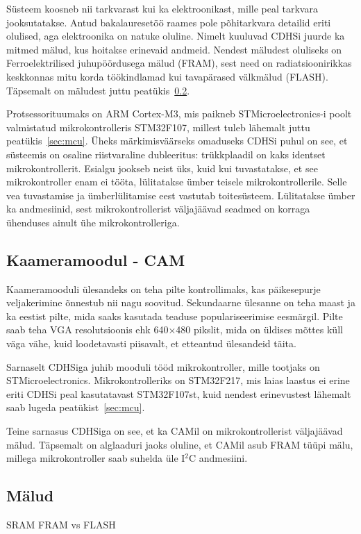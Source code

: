 \documentclass[12pt,a4paper]{article}
\newcommand{\iic}{I\({}^2\)C }
\begin{document}
Süsteem koosneb nii tarkvarast kui ka elektroonikast, mille peal tarkvara
jooksutatakse. Antud bakalauresetöö raames pole põhitarkvara detailid eriti
olulised, aga elektroonika on natuke oluline. Nimelt kuuluvad CDHSi juurde ka
mitmed mälud, kus hoitakse erinevaid andmeid. Nendest mäludest oluliseks on
Ferroelektrilised juhupöördusega mälud (FRAM), sest need on radiatsioonirikkas
keskkonnas mitu korda töökindlamad kui tavapärased välkmälud (FLASH). Täpsemalt
on mäludest juttu peatükis~\ref{sec:m2lud}.

Protsessorituumaks on ARM Cortex-M3, mis paikneb STMicroelectronics-i poolt
valmistatud mikrokontrolleris STM32F107, millest tuleb lähemalt juttu
peatükis~\ref{sec:mcu}. Üheks märkimisväärseks omaduseks CDHSi puhul on see, et
süsteemis on osaline riistvaraline dubleeritus: trükkplaadil on kaks identset
mikrokontrollerit. Esialgu jookseb neist üks, kuid kui tuvastatakse, et see
mikrokontroller enam ei tööta, lülitatakse ümber teisele mikrokontrollerile.
Selle vea tuvastamise ja ümberlülitamise eest vastutab toitesüsteem. Lülitatakse
ümber ka andmesiinid, sest mikrokontrollerist väljajäävad seadmed on korraga
ühenduses ainult ühe mikrokontrolleriga.

\subsection{Kaameramoodul - CAM}
Kaameramooduli ülesandeks on teha pilte kontrollimaks, kas päikesepurje
veljakerimine õnnestub nii nagu soovitud. Sekundaarne ülesanne on teha maast ja
ka eestist pilte, mida saaks kasutada teaduse populariseerimise eesmärgil.
Pilte saab teha VGA resolutsioonis ehk 640\(\times\)480 pikslit, mida on üldises
mõttes küll väga vähe, kuid loodetavasti piisavalt, et etteantud ülesandeid
täita.

Sarnaselt CDHSiga juhib mooduli tööd mikrokontroller, mille tootjaks on
STMicroelectronics. Mikrokontrolleriks on STM32F217, mis laias laastus ei erine
eriti CDHSi peal kasutatavast STM32F107st, kuid nendest erinevustest lähemalt
saab lugeda peatükist~\ref{sec:mcu}.

Teine sarnasus CDHSiga on see, et ka CAMil on mikrokontrollerist väljajäävad
mälud. Täpsemalt on alglaaduri jaoks oluline, et CAMil asub FRAM tüüpi mälu,
millega mikrokontroller saab suhelda üle \iic andmesiini.

\subsection{Mälud}
\label{sec:m2lud}
SRAM
FRAM vs FLASH
\end{document}
